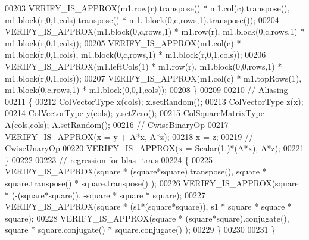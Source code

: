 \begin{DoxyCode}
00203     VERIFY\_IS\_APPROX(m1.row(r).transpose() * m1.col(c).transpose(), m1.block(r,0,1,cols).transpose() * m1.
      block(0,c,rows,1).transpose());
00204     VERIFY\_IS\_APPROX(m1.block(0,c,rows,1) * m1.row(r), m1.block(0,c,rows,1) * m1.block(r,0,1,cols));
00205     VERIFY\_IS\_APPROX(m1.col(c) * m1.block(r,0,1,cols), m1.block(0,c,rows,1) * m1.block(r,0,1,cols));
00206     VERIFY\_IS\_APPROX(m1.leftCols(1) * m1.row(r), m1.block(0,0,rows,1) * m1.block(r,0,1,cols));
00207     VERIFY\_IS\_APPROX(m1.col(c) * m1.topRows(1), m1.block(0,c,rows,1) * m1.block(0,0,1,cols));
00208   \}
00209 
00210   \textcolor{comment}{// Aliasing}
00211   \{
00212     ColVectorType x(cols); x.setRandom();
00213     ColVectorType z(x);
00214     ColVectorType y(cols); y.setZero();
00215     ColSquareMatrixType \hyperlink{group___core___module_class_eigen_1_1_matrix}{A}(cols,cols); \hyperlink{group___core___module_class_eigen_1_1_matrix}{A}.\hyperlink{class_eigen_1_1_plain_object_base_af0e576a0e1aefc9ee346de44cc352ba3}{setRandom}();
00216     \textcolor{comment}{// CwiseBinaryOp}
00217     VERIFY\_IS\_APPROX(x = y + \hyperlink{group___core___module_class_eigen_1_1_matrix}{A}*x, \hyperlink{group___core___module_class_eigen_1_1_matrix}{A}*z);
00218     x = z;
00219     \textcolor{comment}{// CwiseUnaryOp}
00220     VERIFY\_IS\_APPROX(x = Scalar(1.)*(\hyperlink{group___core___module_class_eigen_1_1_matrix}{A}*x), \hyperlink{group___core___module_class_eigen_1_1_matrix}{A}*z);
00221   \}
00222 
00223   \textcolor{comment}{// regression for blas\_trais}
00224   \{
00225     VERIFY\_IS\_APPROX(square * (square*square).transpose(), square * square.transpose() * square.transpose()
      );
00226     VERIFY\_IS\_APPROX(square * (-(square*square)), -square * square * square);
00227     VERIFY\_IS\_APPROX(square * (s1*(square*square)), s1 * square * square * square);
00228     VERIFY\_IS\_APPROX(square * (square*square).conjugate(), square * square.conjugate() * square.conjugate()
      );
00229   \}
00230 
00231 \}
\end{DoxyCode}
